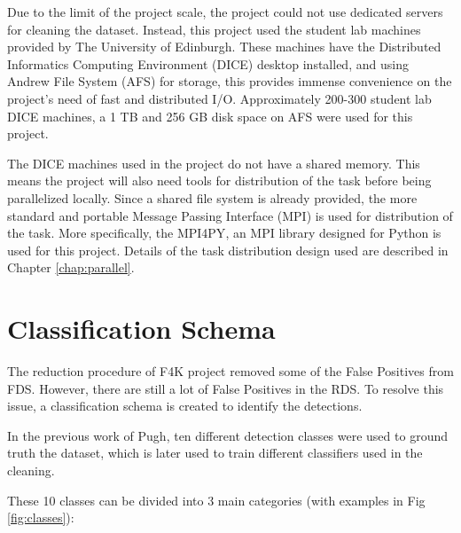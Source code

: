 \documentclass[bsc,logo,twoside,fullspacing,parskip]{infthesis}
\begin{document}
Due to the limit of the project scale, the project could not use dedicated servers for cleaning the dataset.
Instead, this project used the student lab machines provided by The University of Edinburgh.
These machines have the Distributed Informatics Computing Environment (DICE) desktop installed, and using Andrew File System (AFS) for storage, this provides immense convenience on the project's need of fast and distributed I/O.
Approximately 200-300 student lab DICE machines, a 1 TB and 256 GB disk space on AFS were used for this project.

The DICE machines used in the project do not have a shared memory. 
This means the project will also need tools for distribution of the task before being parallelized locally.
Since a shared file system is already provided, the more standard and portable Message Passing Interface (MPI) is used for distribution of the task. 
More specifically, the MPI4PY\cite{MPI4PY}, an MPI library designed for Python is used for this project. Details of the task distribution design used are described in Chapter \ref{chap:parallel}.

\section{Classification Schema}
\label{sec:schema}

The reduction procedure of F4K project removed some of the False Positives from FDS. 
However, there are still a lot of False Positives in the RDS. 
To resolve this issue, a classification schema is created to identify the detections.

In the previous work of Pugh\cite{Pugh}, ten different detection classes were used to ground truth the dataset, which is later used to train different classifiers used in the cleaning. 

These 10 classes can be divided into 3 main categories (with examples in Fig \ref{fig:classes}):

\renewcommand{\labelenumi}{\bfseries\Roman{enumi}}
\renewcommand{\labelenumii}{\bfseries\arabic{enumii}}
\renewcommand{\labelenumiii}{\bfseries\roman{enumiii}}
\end{document}
